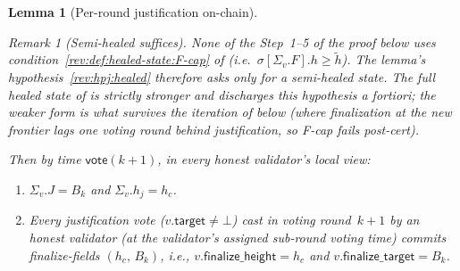 \ifx\litemode\undefined\documentclass{article}\fi
\newcommand{\target}{\mathsf{target}}
\newcommand{\finalizeHeight}{\mathsf{finalize\_height}}
\newcommand{\finalizeTarget}{\mathsf{finalize\_target}}
\newcommand{\vote}{\ensuremath{\mathsf{vote}}}
\newcommand{\comm}[1]{\ensuremath{\widetilde{#1}}}
\theoremstyle{plain}
\newtheorem{lemmaboth}[lemma]{Lemma}
\theoremstyle{definition}
\theoremstyle{remark}
\newtheorem{remark}[theorem]{Remark}
\begin{document}
\begin{lemmaboth}[Per-round justification on-chain]
\begin{remark}[Semi-healed suffices]
None of the Step~1--5 of the proof below uses condition~\ref{rev:def:healed-state:F-cap} of  (i.e.\ $\sigma[\Sigma_v.F].h \geq \comm{h}$). The lemma's hypothesis~\ref{rev:hpj:healed} therefore asks only for a \emph{semi-healed} state. The full healed state of  is strictly stronger and discharges this hypothesis a fortiori; the weaker form is what survives the iteration of  below (where finalization at the new frontier lags one voting round behind justification, so F-cap fails post-cert).
\end{remark}

Then by time $\vote(k+1)$, in every honest validator's local view:
\begin{enumerate}
  \item[\textnormal{(C1)}] $\Sigma_v.J = B_k$ and $\Sigma_v.h_j = h_c$.
  \item[\textnormal{(C2)}] Every justification vote ($v.\target \neq \bot$) cast in voting round~$k+1$ by an honest validator (at the validator's assigned sub-round voting time) commits finalize-fields $(h_c,\, B_k)$, i.e., $v.\finalizeHeight = h_c$ and $v.\finalizeTarget = B_k$.
\end{enumerate}
\fi
\end{lemmaboth}
\end{document}
